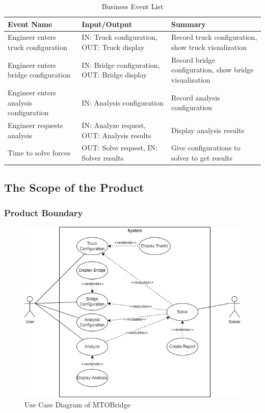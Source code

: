 \documentclass[12pt]{article}
\begin{document}
\begin{table}[hp]
  \caption{Business Event List} \label{TblEventList}
  \begin{tabular}{p{} | p{} | p{}}
  \toprule
  \textbf{Event Name} & \textbf{Input/Output} & \textbf{Summary}\\
  \midrule
  Engineer enters truck configuration & IN: Truck configuration, OUT: Truck display & Record truck configuration, show truck visualization\\
  \midrule
  Engineer enters bridge configuration & IN: Bridge configuration, OUT: Bridge display & Record bridge configuration, show bridge visualization\\
  \midrule
  Engineer enters analysis configuration & IN: Analysis configuration & Record analysis configuration\\
  \midrule
  Engineer requests analysis & IN: Analyze request, OUT: Analysis results & Display analysis results\\
  \midrule
  Time to solve forces & OUT: Solve request, IN: Solver results & Give configurations to solver to get results\\
  \bottomrule
\end{tabular}
\end{table}

\subsection{The Scope of the Product}

\subsubsection{Product Boundary}

\begin{figure}[H]
  \includegraphics[width=\linewidth]{use-case-diagram.png}
  \caption{Use Case Diagram of MTOBridge}
  \label {fig:use-case-diagram}
\end{figure}
\end{document}
